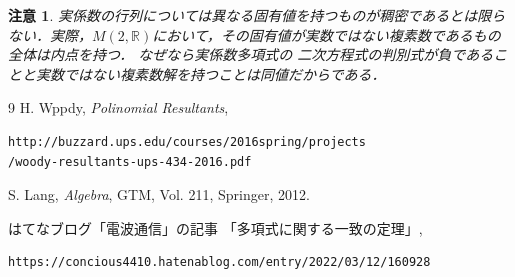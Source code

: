 \documentclass[leqno, a4paper, 12pt]{jsarticle}
\newtheorem*{cau}{注意}
\newcommand{\rr}{\mathbb{R}}
\begin{document}
\begin{cau}
実係数の行列については異なる固有値を持つものが稠密であるとは限らない．実際，$M(2, \rr)$において，その固有値が実数ではない複素数であるもの全体は内点を持つ．
なぜなら実係数多項式の
二次方程式の判別式が負であることと実数ではない複素数解を持つことは同値だからである．
\end{cau}


\begin{thebibliography}{9}
H. Wppdy, 
\textit{Polinomial Resultants}, 
 \begin{verbatim}
http://buzzard.ups.edu/courses/2016spring/projects
/woody-resultants-ups-434-2016.pdf
 \end{verbatim}
 S. Lang,  \textit{Algebra}, 
GTM,  Vol. 211,  Springer, 2012.

はてなブログ「電波通信」の記事
「多項式に関する一致の定理」, 
\begin{verbatim}
https://concious4410.hatenablog.com/entry/2022/03/12/160928
\end{verbatim}

\end{thebibliography}
\end{document}
